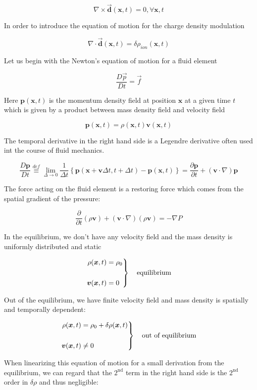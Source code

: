 ﻿\documentclass[twoside]{book}
\numberwithin{equation}{section}
\begin{document}
\[\nabla\times\vec{\bm{d}}(\bm{x},t) = 0,\forall\bm{x},t \]

In order to introduce the equation of motion for the charge density modulation

\[\nabla\cdot\vec{\bm{d}}(\bm{x},t) = \delta\rho_{ion}(\bm{x},t) \]

Let us begin with the Newton's equation of motion for a fluid element

\[\frac{D\vec{p}}{Dt} = \vec{f} \]

Here $\bm{p}(\bm{x},t)$ is the momentum density field at position $\bm{x}$ at a given time $t$ which is given by a product between mass density field and velocity field

\[\bm{p}(\bm{x},t) = \rho(\bm{x},t)\bm{v}(\bm{x},t) \]

The temporal derivative in the right hand side is a Legendre derivative often used int the course of fluid mechanics. 

\[\frac{D\bm{p}}{Dt} \overset{def}{\equiv}\lim_{\Delta\rightarrow0}\frac{1}{\Delta t} \left\{\bm{p}(\bm{x}+\bm{v}\Delta t,t+\Delta t) - \bm{p}(\bm{x},t)\right\} = \frac{\partial\bm{p}}{\partial t}+(\bm{v}\cdot\nabla)\bm{p} \]

The force acting on the fluid element is a restoring force which comes from the spatial gradient of the pressure:

\[\frac{\partial}{\partial t}(\rho\bm{v})+(\bm{v}\cdot\nabla)(\rho\bm{v}) = -\nabla P \]

In the equilibrium, we don't have any velocity field and the mass density is uniformly distributed and static

\[\left.\begin{split}
\rho(\bm{x},t) &= \rho_0\\
\ & \ \\
\bm{v}(\bm{x},t) &= 0
\end{split}\right\}\text{\quad equilibrium} \]

Out of the equilibrium, we have finite velocity field and mass density is spatially and temporally dependent:

\[\left.\begin{split}
\rho(\bm{x},t) &= \rho_0 + \delta\rho(\bm{x},t)\\
\ & \ \\
\bm{v}(\bm{x},t) &\neq 0
\end{split}\right\}\text{\quad out of equilibrium} \]

When linearizing this equation of motion for a small derivation from the equilibrium, we can regard that the $2^{\text{nd}}$ term in the right hand side is the $2^{\text{nd}}$ order in $\delta\rho$ and thus negligible:
\end{document}

